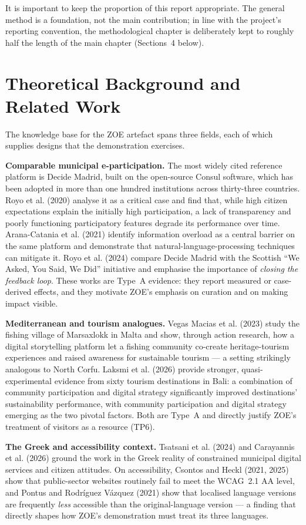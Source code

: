 \documentclass[11pt,a4paper]{article}
\begin{document}
It is important to keep the proportion of this report appropriate. The general method is a foundation, not the main contribution; in line with the project's reporting convention, the methodological chapter is deliberately kept to roughly half the length of the main chapter (Sections~4 below).

\section{Theoretical Background and Related Work}

The knowledge base for the ZOE artefact spans three fields, each of which supplies designs that the demonstration exercises.

\textbf{Comparable municipal e-participation.} The most widely cited reference platform is Decide Madrid, built on the open-source Consul software, which has been adopted in more than one hundred institutions across thirty-three countries. Royo et al. (2020) analyse it as a critical case and find that, while high citizen expectations explain the initially high participation, a lack of transparency and poorly functioning participatory features degrade its performance over time. Arana-Catania et al. (2021) identify information overload as a central barrier on the same platform and demonstrate that natural-language-processing techniques can mitigate it. Royo et al. (2024) compare Decide Madrid with the Scottish ``We Asked, You Said, We Did'' initiative and emphasise the importance of \emph{closing the feedback loop}. These works are Type~A evidence: they report measured or case-derived effects, and they motivate ZOE's emphasis on curation and on making impact visible.

\textbf{Mediterranean and tourism analogues.} Vegas Macias et al. (2023) study the fishing village of Marsaxlokk in Malta and show, through action research, how a digital storytelling platform let a fishing community co-create heritage-tourism experiences and raised awareness for sustainable tourism --- a setting strikingly analogous to North Corfu. Laksmi et al. (2026) provide stronger, quasi-experimental evidence from sixty tourism destinations in Bali: a combination of community participation and digital strategy significantly improved destinations' sustainability performance, with community participation and digital strategy emerging as the two pivotal factors. Both are Type~A and directly justify ZOE's treatment of visitors as a resource (TP6).

\textbf{The Greek and accessibility context.} Tsatsani et al. (2024) and Carayannis et al. (2026) ground the work in the Greek reality of constrained municipal digital services and citizen attitudes. On accessibility, Csontos and Heckl (2021, 2025) show that public-sector websites routinely fail to meet the WCAG~2.1 AA level, and Pontus and Rodr\'iguez V\'azquez (2021) show that localised language versions are frequently \emph{less} accessible than the original-language version --- a finding that directly shapes how ZOE's demonstration must treat its three languages.
\end{document}
